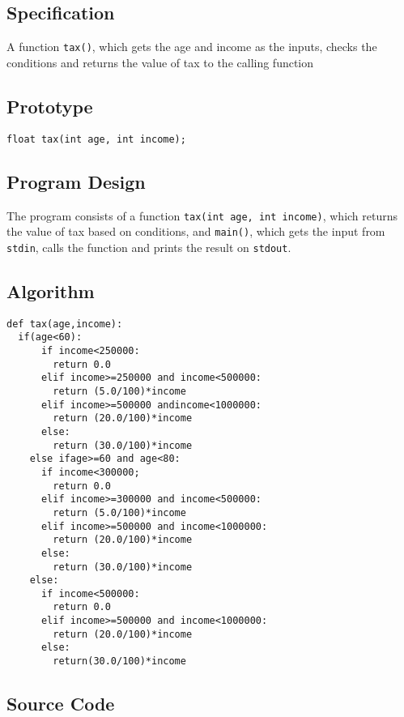 \documentclass[11pt]{article}
\begin{document}
\subsection*{Specification}
\label{sec-7-1}
A function \texttt{tax()}, which gets the age and income as the inputs, checks the conditions
and returns the value of tax to the calling function
\subsection*{Prototype}
\label{sec-7-2}
\begin{verbatim}
float tax(int age, int income);
\end{verbatim}
\subsection*{Program Design}
\label{sec-7-3}
The program consists of a function \texttt{tax(int age, int income)}, which returns the value
of tax based on conditions, and \texttt{main()}, which gets the input from \texttt{stdin}, calls
the function and prints the result on \texttt{stdout}.
\subsection*{Algorithm}
\label{sec-7-4}
\begin{verbatim}
def tax(age,income):
  if(age<60):
      if income<250000:
        return 0.0
      elif income>=250000 and income<500000:
        return (5.0/100)*income
      elif income>=500000 andincome<1000000:
        return (20.0/100)*income
      else:
        return (30.0/100)*income
    else ifage>=60 and age<80:
      if income<300000;
        return 0.0
      elif income>=300000 and income<500000:
        return (5.0/100)*income
      elif income>=500000 and income<1000000:
        return (20.0/100)*income
      else:
        return (30.0/100)*income
    else:
      if income<500000:
        return 0.0
      elif income>=500000 and income<1000000:
        return (20.0/100)*income
      else:
        return(30.0/100)*income
\end{verbatim}
\subsection*{Source Code}
\label{sec-7-5}
\end{document}
